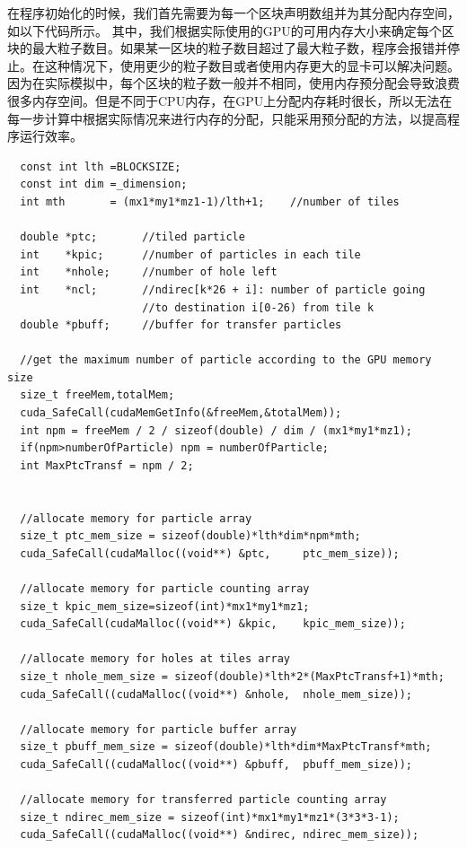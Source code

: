 在程序初始化的时候，我们首先需要为每一个区块声明数组并为其分配内存空间，如以下代码所示。
其中，我们根据实际使用的GPU的可用内存大小来确定每个区块的最大粒子数目。如果某一区块的粒子数目超过了最大粒子数，程序会报错并停止。在这种情况下，使用更少的粒子数目或者使用内存更大的显卡可以解决问题。
因为在实际模拟中，每个区块的粒子数一般并不相同，使用内存预分配会导致浪费很多内存空间。但是不同于CPU内存，在GPU上分配内存耗时很长，所以无法在每一步计算中根据实际情况来进行内存的分配，只能采用预分配的方法，以提高程序运行效率。
\begin{lstlisting}
  const int lth =BLOCKSIZE;
  const int dim =_dimension;
  int mth       = (mx1*my1*mz1-1)/lth+1;    //number of tiles

  double *ptc;       //tiled particle
  int    *kpic;      //number of particles in each tile
  int    *nhole;     //number of hole left
  int    *ncl;       //ndirec[k*26 + i]: number of particle going
                     //to destination i[0-26) from tile k
  double *pbuff;     //buffer for transfer particles

  //get the maximum number of particle according to the GPU memory size
  size_t freeMem,totalMem;
  cuda_SafeCall(cudaMemGetInfo(&freeMem,&totalMem));
  int npm = freeMem / 2 / sizeof(double) / dim / (mx1*my1*mz1);
  if(npm>numberOfParticle) npm = numberOfParticle;
  int MaxPtcTransf = npm / 2;


  //allocate memory for particle array
  size_t ptc_mem_size = sizeof(double)*lth*dim*npm*mth;
  cuda_SafeCall(cudaMalloc((void**) &ptc,     ptc_mem_size));

  //allocate memory for particle counting array
  size_t kpic_mem_size=sizeof(int)*mx1*my1*mz1;
  cuda_SafeCall(cudaMalloc((void**) &kpic,    kpic_mem_size));

  //allocate memory for holes at tiles array
  size_t nhole_mem_size = sizeof(double)*lth*2*(MaxPtcTransf+1)*mth;
  cuda_SafeCall((cudaMalloc((void**) &nhole,  nhole_mem_size));

  //allocate memory for particle buffer array
  size_t pbuff_mem_size = sizeof(double)*lth*dim*MaxPtcTransf*mth;
  cuda_SafeCall((cudaMalloc((void**) &pbuff,  pbuff_mem_size));

  //allocate memory for transferred particle counting array
  size_t ndirec_mem_size = sizeof(int)*mx1*my1*mz1*(3*3*3-1);
  cuda_SafeCall((cudaMalloc((void**) &ndirec, ndirec_mem_size));
\end{lstlisting}

